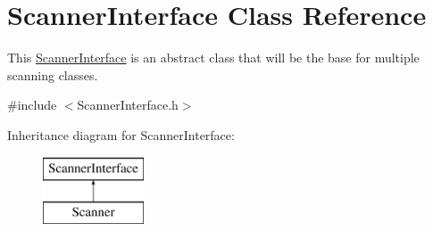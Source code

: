 \hypertarget{classScannerInterface}{}\section{Scanner\+Interface Class Reference}
\label{classScannerInterface}


This \hyperlink{classScannerInterface}{Scanner\+Interface} is an abstract class that will be the base for multiple scanning classes.  




{\ttfamily \#include $<$Scanner\+Interface.\+h$>$}

Inheritance diagram for Scanner\+Interface\+:\begin{figure}[H]
\begin{center}
\leavevmode
\includegraphics[height=2.000000cm]{classScannerInterface}
\end{center}
\end{figure}
